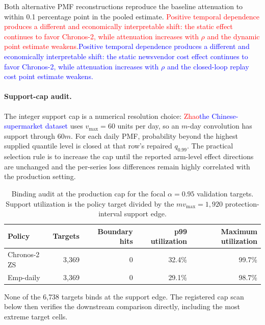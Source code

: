 \documentclass[msom,dblanonrev]{informs4}
\newcommand{\add}[1]{\textcolor{blue}{#1}}
\newcommand{\reduce}[1]{\textcolor{red}{#1}\hspace{0.5em}}
\begin{document}
Both alternative PMF reconstructions reproduce the baseline attenuation to within 0.1 percentage point in the pooled estimate.
\reduce{Positive temporal dependence produces a different and economically interpretable shift: the static effect continues to favor Chronos-2, while attenuation increases with $\rho$ and the dynamic point estimate weakens.}\add{Positive temporal dependence produces a different and economically interpretable shift: the static newsvendor cost effect continues to favor Chronos-2, while attenuation increases with $\rho$ and the closed-loop replay cost point estimate weakens.}

\paragraph{Support-cap audit.}
The integer support cap is a numerical resolution choice: \reduce{Zhao}\add{the Chinese-supermarket dataset} uses $v_{\max}=60$ units per day, so an $m$-day convolution has support through $60m$.
For each daily PMF, probability beyond the highest supplied quantile level is closed at that row's repaired $q_{0.99}$.
The practical selection rule is to increase the cap until the reported arm-level effect directions are unchanged and the per-series loss differences remain highly correlated with the production setting.

\begin{table}[htbp]
\caption{Binding audit at the production cap for the focal $\alpha=0.95$ validation targets. Support utilization is the policy target divided by the $m v_{\max}=1{,}920$ protection-interval support edge.}
\label{tab:oa_vmax_binding}
\centering\small
\begin{tabular}{lrrrr}
\toprule
\textbf{Policy} & \textbf{Targets} & \textbf{Boundary hits} & \textbf{p99 utilization} & \textbf{Maximum utilization} \\
\midrule
Chronos-2 ZS & 3{,}369 & 0 & 32.4\% & 99.7\% \\
Emp-daily    & 3{,}369 & 0 & 29.1\% & 98.7\% \\
\bottomrule
\end{tabular}
\end{table}

None of the 6{,}738 targets binds at the support edge.
The registered cap scan below then verifies the downstream comparison directly, including the most extreme target cells.
\end{document}
